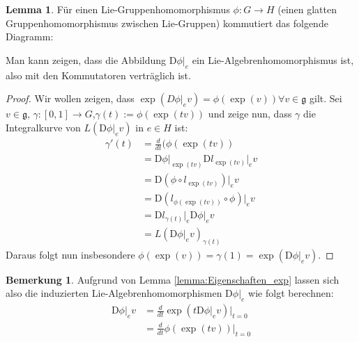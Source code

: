 \documentclass[a4paper]{scrreprt}
\numberwithin{equation}{chapter}
\newcommand{\DD}{\mathrm{D}}
\theoremstyle{definition}
\newtheorem{lemma}[defn]{Lemma}
\newtheorem{bem}[defn]{Bemerkung}
\begin{document}
		\begin{lemma}
			Für einen Lie-Gruppenhomomorphismus $\phi\colon G\rightarrow H$ (einen glatten Gruppenhomomorphismus zwischen Lie-Gruppen) kommutiert das folgende Diagramm:
			\begin{center}
			\end{center}
			Man kann zeigen, dass die Abbildung $\DD\phi\vert_e$ ein Lie-Algebrenhomomorphismus ist, also mit den Kommutatoren verträglich ist.
			\begin{proof}
				Wir wollen zeigen, dass $\exp(D\phi\vert_e v)=\phi(\exp(v))\forall v\in\mathfrak{g}$ gilt. Sei $v\in\mathfrak{g}$, ${\gamma\colon [0,1]\rightarrow G}$,$ \gamma(t):=\phi(\exp(tv))$ und zeige nun, dass $\gamma$ die Integralkurve von $L(\DD\phi\vert_e v)$ in $e\in H$ ist:
				\begin{align*}
					\gamma'(t)&=\frac{d}{dt}(\phi(\exp(tv))\\
					&=\DD\phi\vert_{\exp(tv)}\DD l_{\exp(tv)}\vert_e v\\
					&=\DD(\phi\circ l_{\exp(tv)})\vert_e v\\
					&=\DD(l_{\phi(\exp(tv))}\circ\phi)\vert_e v\\
					&=\DD l_{\gamma(t)}\vert_e\DD\phi\vert_ev\\
					&=L(\DD\phi\vert_e v)_{\gamma(t)}
				\end{align*}
				Daraus folgt nun insbesondere $\phi(\exp(v))=\gamma(1)=\exp(\DD\phi\vert_e v)$.
			\end{proof}
		\end{lemma}
		\begin{bem}\label{bem:exp_induziert_Abbildungen}
			Aufgrund von Lemma \ref{lemma:Eigenschaften_exp} lassen sich also die induzierten Lie-Algebrenhomomorphismen $\DD\phi\vert_e$ wie folgt berechnen:
			\begin{align*}
				\DD\phi\vert_e v&=\frac{d}{dt}\exp(t \DD\phi\vert_e v)\Big\vert_{t=0}\\
				&=\frac{d}{dt}\phi(\exp(tv))\Big\vert_{t=0}
			\end{align*}
		\end{bem}
\end{document}
